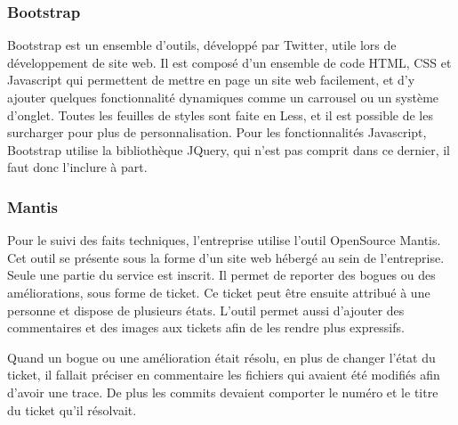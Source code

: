 \documentclass[12pt,a4paper]{article}
\begin{document}
\subsubsection{Bootstrap}
Bootstrap est un ensemble d'outils, développé par Twitter, utile lors de développement de site web. Il est composé d'un ensemble de code HTML, CSS et Javascript qui permettent de mettre en page un site web facilement, et d'y ajouter quelques fonctionnalité dynamiques comme un carrousel ou un système d'onglet. Toutes les feuilles de styles sont faite en Less, et il est possible de les surcharger pour plus de personnalisation. Pour les fonctionnalités Javascript, Bootstrap utilise la bibliothèque JQuery, qui n'est pas comprit dans ce dernier, il faut donc l'inclure à part.

\subsubsection{Mantis}
Pour le suivi des faits techniques, l'entreprise utilise l'outil OpenSource Mantis. Cet outil se présente sous la forme d'un site web hébergé au sein de l'entreprise. Seule une partie du service est inscrit. Il permet de reporter des bogues ou des améliorations, sous forme de ticket. Ce ticket peut être ensuite attribué à une personne et dispose de plusieurs états. L'outil permet aussi d'ajouter des commentaires et des images aux tickets afin de les rendre plus expressifs.\par 
Quand un bogue ou une amélioration était résolu, en plus de changer l'état du ticket, il fallait préciser en commentaire les fichiers qui avaient été modifiés afin d'avoir une trace. De plus les commits devaient comporter le numéro et le titre du ticket qu'il résolvait.\par

\newpage
\end{document}
